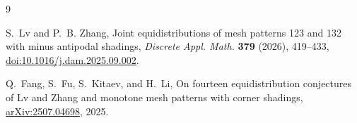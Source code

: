 \documentclass[11pt]{amsart}
\theoremstyle{plain}
\theoremstyle{remark}
\begin{document}
\begin{thebibliography}{9}

S.~Lv and P.~B. Zhang,
\newblock Joint equidistributions of mesh patterns 123 and 132 with
minus antipodal shadings,
\newblock \emph{Discrete Appl. Math.} \textbf{379} (2026), 419--433,
\newblock
\href{https://doi.org/10.1016/j.dam.2025.09.002}
{doi:10.1016/j.dam.2025.09.002}.

Q.~Fang, S.~Fu, S.~Kitaev, and H.~Li,
\newblock On fourteen equidistribution conjectures of Lv and Zhang
and monotone mesh patterns with corner shadings,
\newblock
\href{https://arxiv.org/abs/2507.04698}
{arXiv:2507.04698}, 2025.

\end{thebibliography}
\end{document}
